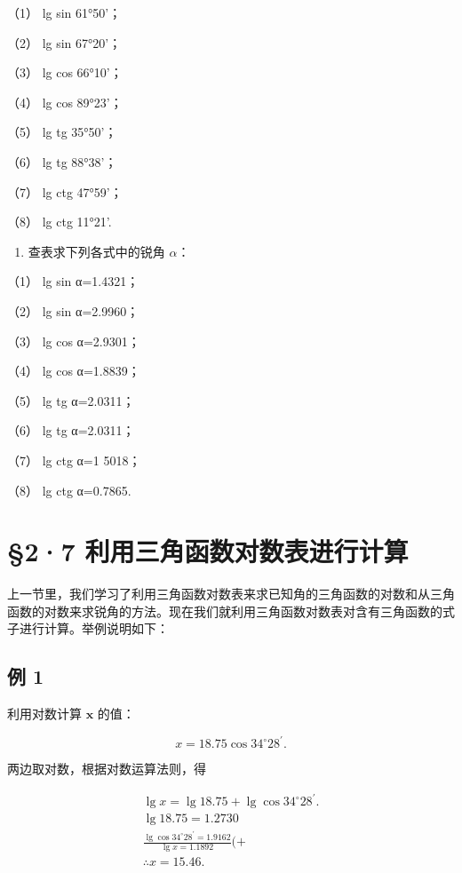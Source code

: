 （1） lg sin 61°50'；

（2） lg sin 67°20'；

（3） lg cos 66°10'；

（4） lg cos 89°23'；

（5） lg tg 35°50'；

（6） lg tg 88°38'；

（7） lg ctg 47°59'；

（8） lg ctg 11°21'.

\begin{enumerate}[start=2]
\item
  查表求下列各式中的锐角 \(\alpha\)：
\end{enumerate}

（1） lg sin α=1.4321；

（2） lg sin α=2.9960；

（3） lg cos α=2.9301；

（4） lg cos α=1.8839；

（5） lg tg α=2.0311；

（6） lg tg α=2.0311；

（7） lg ctg α=1 5018；

（8） lg ctg α=0.7865.

\section{§2·7 利用三角函数对数表进行计算}

上一节里，我们学习了利用三角函数对数表来求已知角的三角函数的对数和从三角函数的对数来求锐角的方法。现在我们就利用三角函数对数表对含有三角函数的式子进行计算。举例说明如下：

\subsection{例 1}

利用对数计算 \(\pmb{x}\) 的值：

\[
x = 18.75 \cos 34 ^{\circ} 28 ^{\prime}.
\]

 两边取对数，根据对数运算法则，得

\[
\begin{array}{l} \lg x = \lg 18.75 + \lg \cos 34 ^{\circ} 28 ^{\prime}. \\ \lg 18.75 = 1.2730 \\ \frac {\lg \cos 34 ^{\circ} 28 ^{\prime} = 1.9162}{\lg x = 1.1892} (+ \\ \therefore x = 15.46. \\ \end{array}
\]


